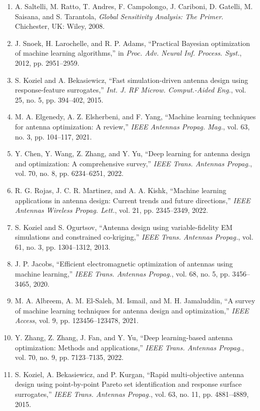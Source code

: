 \documentclass[conference]{IEEEtran}
\begin{document}
\begin{enumerate}
    \item A. Saltelli, M. Ratto, T. Andres, F. Campolongo, J. Cariboni, D. Gatelli, M. Saisana, and S. Tarantola, \emph{Global Sensitivity Analysis: The Primer}. Chichester, UK: Wiley, 2008.
    \item J. Snoek, H. Larochelle, and R. P. Adams, ``Practical Bayesian optimization of machine learning algorithms,'' in \emph{Proc. Adv. Neural Inf. Process. Syst.}, 2012, pp. 2951--2959.
    \item S. Koziel and A. Bekasiewicz, ``Fast simulation-driven antenna design using response-feature surrogates,'' \emph{Int. J. RF Microw. Comput.-Aided Eng.}, vol. 25, no. 5, pp. 394--402, 2015.
    \item M. A. Elgenedy, A. Z. Elsherbeni, and F. Yang, ``Machine learning techniques for antenna optimization: A review,'' \emph{IEEE Antennas Propag. Mag.}, vol. 63, no. 3, pp. 104--117, 2021.
    \item Y. Chen, Y. Wang, Z. Zhang, and Y. Yu, ``Deep learning for antenna design and optimization: A comprehensive survey,'' \emph{IEEE Trans. Antennas Propag.}, vol. 70, no. 8, pp. 6234--6251, 2022.
    \item R. G. Rojas, J. C. R. Martinez, and A. A. Kishk, ``Machine learning applications in antenna design: Current trends and future directions,'' \emph{IEEE Antennas Wireless Propag. Lett.}, vol. 21, pp. 2345--2349, 2022.
    \item S. Koziel and S. Ogurtsov, ``Antenna design using variable-fidelity EM simulations and constrained co-kriging,'' \emph{IEEE Trans. Antennas Propag.}, vol. 61, no. 3, pp. 1304--1312, 2013.
    \item J. P. Jacobs, ``Efficient electromagnetic optimization of antennas using machine learning,'' \emph{IEEE Trans. Antennas Propag.}, vol. 68, no. 5, pp. 3456--3465, 2020.
    \item M. A. Albreem, A. M. El-Saleh, M. Ismail, and M. H. Jamaluddin, ``A survey of machine learning techniques for antenna design and optimization,'' \emph{IEEE Access}, vol. 9, pp. 123456--123478, 2021.
    \item Y. Zhang, Z. Zhang, J. Fan, and Y. Yu, ``Deep learning-based antenna optimization: Methods and applications,'' \emph{IEEE Trans. Antennas Propag.}, vol. 70, no. 9, pp. 7123--7135, 2022.
    \item S. Koziel, A. Bekasiewicz, and P. Kurgan, ``Rapid multi-objective antenna design using point-by-point Pareto set identification and response surface surrogates,'' \emph{IEEE Trans. Antennas Propag.}, vol. 63, no. 11, pp. 4881--4889, 2015.

\end{enumerate}
\end{document}
